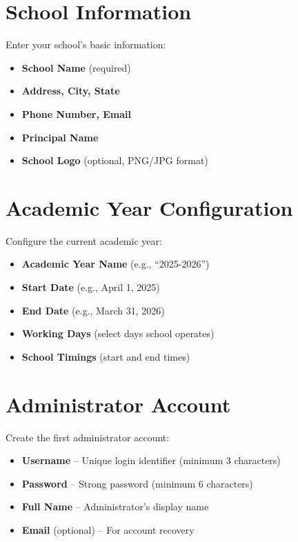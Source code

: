 \documentclass[12pt,a4paper]{report}
\begin{document}
\section{School Information}

Enter your school's basic information:

\begin{itemize}[leftmargin=*]
    \item \textbf{School Name} (required)
    \item \textbf{Address, City, State}
    \item \textbf{Phone Number, Email}
    \item \textbf{Principal Name}
    \item \textbf{School Logo} (optional, PNG/JPG format)
\end{itemize}

\section{Academic Year Configuration}

Configure the current academic year:

\begin{itemize}[leftmargin=*]
    \item \textbf{Academic Year Name} (e.g., ``2025-2026'')
    \item \textbf{Start Date} (e.g., April 1, 2025)
    \item \textbf{End Date} (e.g., March 31, 2026)
    \item \textbf{Working Days} (select days school operates)
    \item \textbf{School Timings} (start and end times)
\end{itemize}

\section{Administrator Account}

Create the first administrator account:

\begin{itemize}[leftmargin=*]
    \item \textbf{Username} -- Unique login identifier (minimum 3 characters)
    \item \textbf{Password} -- Strong password (minimum 6 characters)
    \item \textbf{Full Name} -- Administrator's display name
    \item \textbf{Email} (optional) -- For account recovery
\end{itemize}
\end{document}
